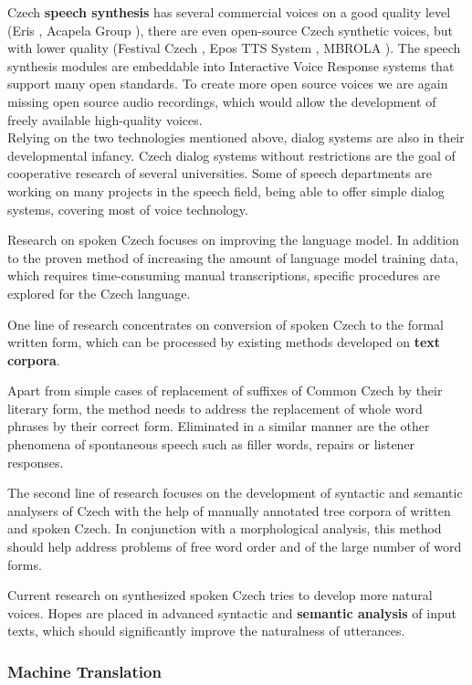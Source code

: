 \begin{multicols}{2}
Czech \textbf{speech synthesis} has several commercial voices on a good quality level (Eris \cite{Note11}, Acapela Group \cite{Note14}), there are even open-source Czech synthetic voices, but with lower quality (Festival Czech \cite{Note15}, Epos TTS System \cite{Note16}, MBROLA \cite{Note17}). The speech synthesis modules are embeddable into Interactive Voice Response systems that support many open standards. To create more open source voices we are again missing open source audio recordings, which would allow the development of freely available high-quality voices.\\
Relying on the two technologies mentioned above, dialog systems are also in their developmental infancy. Czech dialog systems without restrictions are the goal of cooperative research of several universities. Some of speech departments are working on many projects in the speech field, being able to offer simple dialog systems, covering most of voice technology.

Research on spoken Czech focuses on improving the language model. In addition to the proven method of increasing the amount of language model training data, which requires time-consuming manual transcriptions, specific procedures are explored for the Czech language.

One line of research concentrates on conversion of spoken Czech to the formal written form, which can be processed by existing methods developed on \textbf{text corpora}.

Apart from simple cases of replacement of suffixes of Common Czech by their literary form, the method needs to address the replacement of whole word phrases by their correct form. Eliminated in a similar manner are the other phenomena of spontaneous speech such as filler words, repairs or listener responses.

The second line of research focuses on the development of syntactic and semantic analysers of Czech with the help of manually annotated tree corpora of written and spoken Czech. In conjunction with a morphological analysis, this method should help address problems of free word order and of the large number of word forms.

Current research on synthesized spoken Czech tries to develop more natural voices. Hopes are placed in advanced syntactic and \textbf{semantic analysis} of input texts, which should significantly improve the naturalness of utterances.

\subsubsection{Machine Translation}


\end{multicols}
